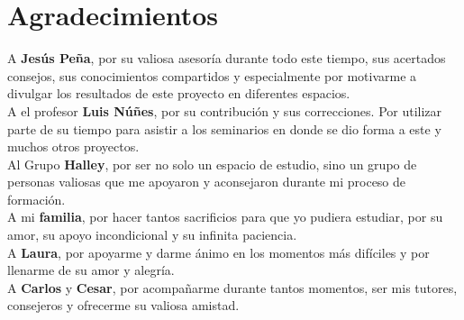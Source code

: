 \chapter*{Agradecimientos} %
A \textbf{Jesús Peña}, por su valiosa asesoría durante todo este tiempo, sus acertados consejos, sus conocimientos compartidos y especialmente por motivarme a divulgar los resultados de este proyecto en diferentes espacios.\\

A el profesor \textbf{Luis Núñes}, por su contribución y sus correcciones. Por utilizar parte de su tiempo para asistir a los seminarios en donde se dio forma a este y muchos otros proyectos.\\

Al Grupo \textbf{Halley}, por ser no solo un espacio de estudio, sino un grupo de personas valiosas que me apoyaron y aconsejaron durante mi proceso de formación.\\

A mi \textbf{familia}, por hacer tantos sacrificios para que yo pudiera estudiar, por su amor, su apoyo incondicional y su infinita paciencia. \\

A \textbf{Laura}, por apoyarme y darme ánimo en los momentos más difíciles y por llenarme de su amor y alegría.\\

A \textbf{Carlos} y \textbf{Cesar}, por acompañarme durante tantos momentos, ser mis tutores, consejeros y ofrecerme su valiosa amistad.      


